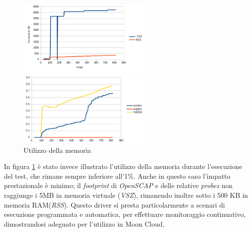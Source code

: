 \documentclass[../main.tex]{subfiles}
\begin{document}
\begin{figure}[H]
 \begin{minipage}[b]{6cm}
   \centering
   \includegraphics[width=6.6cm]{immagini/plot1mem.png}
 \end{minipage}
 \hspace{2mm} \hspace{3mm}
 \begin{minipage}[b]{9cm}
  \centering
   \includegraphics[width=6.6cm]{immagini/plot1mem2.png}
 \end{minipage}
 \caption{Utilizzo della memoria}\label{ref:plot1mem}
\end{figure}
In figura \ref{ref:plot1mem} è stato invece illustrato l'utilizzo della memoria durante l'esecuzione del test, che rimane sempre inferiore all'1\%. Anche in questo caso l'impatto prestazionale è minimo; il \textit{footprint} di \textit{OpenSCAP} e delle relative \textit{probes} non raggiunge i 5MB in memoria virtuale (\textit{VSZ}), rimanendo inoltre sotto i 500 KB in memoria RAM(\textit{RSS}).
Questo driver si presta particolarmente a scenari di esecuzione programmata e automatica, per effettuare monitoraggio continuativo, dimostrandosi adeguato per l'utilizzo in Moon Cloud.
\end{document}
